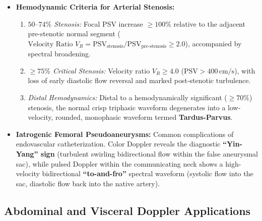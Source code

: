 \documentclass[11pt,a4paper]{article}
\begin{document}
\begin{itemize}[leftmargin=*]
    \item \textbf{Hemodynamic Criteria for Arterial Stenosis:}
    \begin{enumerate}
        \item \textit{$50\text{--}74\%$ Stenosis:} Focal PSV increase $\ge 100\%$ relative to the adjacent pre-stenotic normal segment ($\text{Velocity Ratio } V_R = \text{PSV}_{\text{stenosis}} / \text{PSV}_{\text{pre-stenosis}} \ge 2.0$), accompanied by spectral broadening.
        \item \textit{$\ge 75\%$ Critical Stenosis:} Velocity ratio $V_R \ge 4.0$ ($\text{PSV} > 400\,\text{cm/s}$), with loss of early diastolic flow reversal and marked post-stenotic turbulence.
        \item \textit{Distal Hemodynamics:} Distal to a hemodynamically significant ($\ge 70\%$) stenosis, the normal crisp triphasic waveform degenerates into a low-velocity, rounded, monophasic waveform termed \textbf{Tardus-Parvus}.
    \end{enumerate}
    \item \textbf{Iatrogenic Femoral Pseudoaneurysms:} Common complications of endovascular catheterization. Color Doppler reveals the diagnostic \textbf{``Yin-Yang'' sign} (turbulent swirling bidirectional flow within the false aneurysmal sac), while pulsed Doppler within the communicating neck shows a high-velocity bidirectional \textbf{``to-and-fro''} spectral waveform (systolic flow into the sac, diastolic flow back into the native artery).
\end{itemize}

\subsection{Abdominal and Visceral Doppler Applications}
\end{document}
